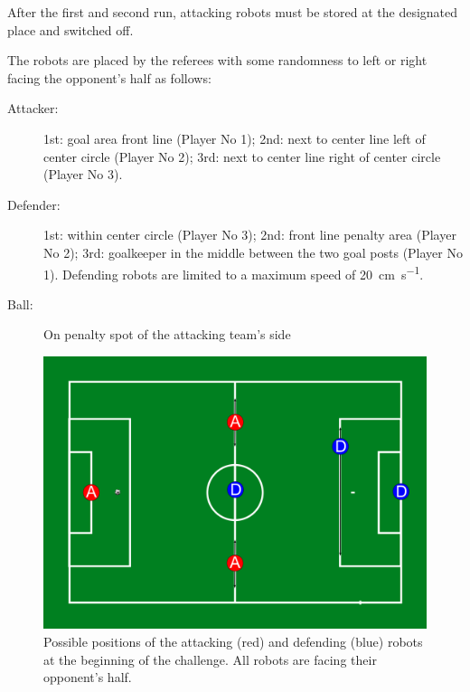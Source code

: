         After the first and second run, attacking robots must be stored at the designated place and switched off.

        The robots are placed by the referees with some randomness to left or right facing the opponent's half as follows:

        \begin{description}
            \item[Attacker:] 1st: goal area front line (Player No 1); 2nd: next to center line left of center circle (Player No 2); 3rd: next to center line right of center circle (Player No 3).
            \item[Defender:] 1st: within center circle (Player No 3); 2nd: front line penalty area (Player No 2); 3rd: goalkeeper in the middle between the two goal posts (Player No 1). Defending robots are limited to a maximum speed of \qty{20}{\cm \per \second}.
            \item[Ball:] On penalty spot of the attacking team's side
        \end{description}

        \begin{figure}[hb!]
            \begin{center}
                \leavevmode
                \includegraphics[width=1\columnwidth]{figs/dbhc_initial.png}
                \caption{Possible positions of the {\color{red}attacking (red)} and {\color{blue}defending (blue)} robots at the beginning of the challenge. All robots are facing their opponent's half.}
                \label{fig:ball_handling_inital_positions}
            \end{center}
        \end{figure}

